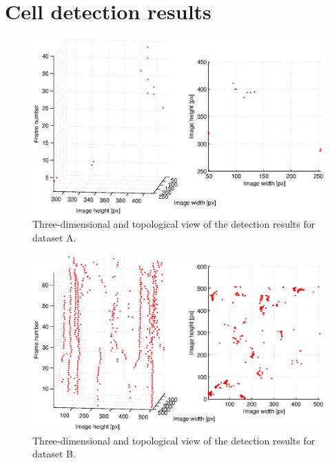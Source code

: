 \chapter{Cell detection results}
	\label{app:appendix_detectionresults}

\begin{figure}
	\includegraphics[width=\textwidth]{images/fig_results_detector_sequences_1}
	\caption{Three-dimensional and topological view of the detection results for dataset A.}
	\label{fig:results_detector_sequences_1}
\end{figure}

\begin{figure}
	\includegraphics[width=\textwidth]{images/fig_results_detector_sequences_2}
	\caption{Three-dimensional and topological view of the detection results for dataset B.}
	\label{fig:results_detector_sequences_2}
\end{figure}

